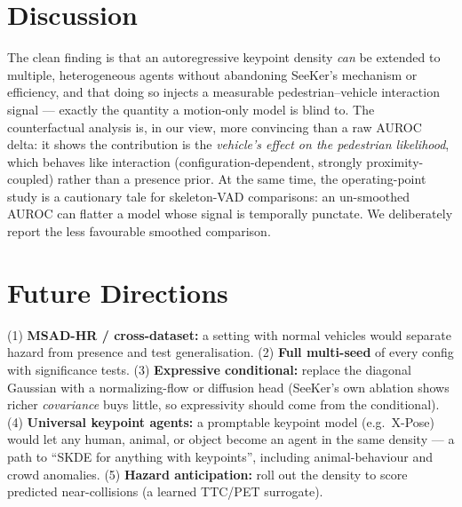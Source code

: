 \documentclass{article}
\begin{document}
\section{Discussion}
\label{sec:discussion}
The clean finding is that an autoregressive keypoint density \emph{can} be
extended to multiple, heterogeneous agents without abandoning SeeKer's mechanism
or efficiency, and that doing so injects a measurable pedestrian--vehicle
interaction signal --- exactly the quantity a motion-only model is blind to. The
counterfactual analysis is, in our view, more convincing than a raw AUROC delta:
it shows the contribution is the \emph{vehicle's effect on the pedestrian
likelihood}, which behaves like interaction (configuration-dependent, strongly
proximity-coupled) rather than a presence prior. At the same time, the
operating-point study is a cautionary tale for skeleton-VAD comparisons: an
un-smoothed AUROC can flatter a model whose signal is temporally punctate. We
deliberately report the less favourable smoothed comparison.

\section{Future Directions}
\label{sec:future}
(1) \textbf{MSAD-HR / cross-dataset:} a setting with normal vehicles would
separate hazard from presence and test generalisation. (2) \textbf{Full
multi-seed} of every config with significance tests. (3) \textbf{Expressive
conditional:} replace the diagonal Gaussian with a normalizing-flow or diffusion
head (SeeKer's own ablation shows richer \emph{covariance} buys little, so
expressivity should come from the conditional). (4) \textbf{Universal keypoint
agents:} a promptable keypoint model (e.g.\ X-Pose) would let any human, animal,
or object become an agent in the same density --- a path to ``SKDE for anything
with keypoints'', including animal-behaviour and crowd anomalies. (5)
\textbf{Hazard anticipation:} roll out the density to score predicted
near-collisions (a learned TTC/PET surrogate).
\end{document}
